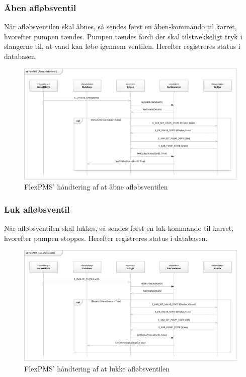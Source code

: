 \subsubsection{Åben afløbsventil}

Når afløbsventilen skal åbnes, så sendes først en åben-kommando til karret, hvorefter pumpen tændes. Pumpen tændes fordi der skal tilstrækkeligt tryk i slangerne til, at vand kan løbe igennem ventilen. Herefter registreres status i databasen.

\begin{figure}[H]
	\centering
	\includegraphics[scale=.6]{SoftwareArkitektur/FlexPMS/Diagrammer/Case_OpenOValve.png}
	\caption{FlexPMS' håndtering af at åbne afløbsventilen}
	\label{photo:OpenOValveUseCase}
\end{figure}


\subsubsection{Luk afløbsventil}

Når afløbsventilen skal lukkes, så sendes først en luk-kommando til karret, hvorefter pumpen stoppes. Herefter registreres status i databasen.

\begin{figure}[H]
	\centering
	\includegraphics[scale=.6]{SoftwareArkitektur/FlexPMS/Diagrammer/Case_CloseOValve.png}
	\caption{FlexPMS' håndtering af at lukke afløbsventilen}
	\label{photo:CloseOValveUseCase}
\end{figure}


